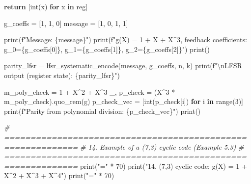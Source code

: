 \documentclass[
]{article}
\newenvironment{Shaded}{}{}
\newcommand{\BuiltInTok}[1]{\textcolor[rgb]{0.00,0.50,0.00}{#1}}
\newcommand{\CharTok}[1]{\textcolor[rgb]{0.25,0.44,0.63}{#1}}
\newcommand{\CommentTok}[1]{\textcolor[rgb]{0.38,0.63,0.69}{\textit{#1}}}
\newcommand{\ControlFlowTok}[1]{\textcolor[rgb]{0.00,0.44,0.13}{\textbf{#1}}}
\newcommand{\DecValTok}[1]{\textcolor[rgb]{0.25,0.63,0.44}{#1}}
\newcommand{\KeywordTok}[1]{\textcolor[rgb]{0.00,0.44,0.13}{\textbf{#1}}}
\newcommand{\NormalTok}[1]{#1}
\newcommand{\OperatorTok}[1]{\textcolor[rgb]{0.40,0.40,0.40}{#1}}
\newcommand{\SpecialCharTok}[1]{\textcolor[rgb]{0.25,0.44,0.63}{#1}}
\newcommand{\SpecialStringTok}[1]{\textcolor[rgb]{0.73,0.40,0.53}{#1}}
\newcommand{\StringTok}[1]{\textcolor[rgb]{0.25,0.44,0.63}{#1}}
\begin{document}
\begin{Shaded}
\begin{Highlighting}[]
    \ControlFlowTok{return}\NormalTok{ [}\BuiltInTok{int}\NormalTok{(x) }\ControlFlowTok{for}\NormalTok{ x }\KeywordTok{in}\NormalTok{ reg]}

\NormalTok{g\_coeffs }\OperatorTok{=}\NormalTok{ [}\DecValTok{1}\NormalTok{, }\DecValTok{1}\NormalTok{, }\DecValTok{0}\NormalTok{]}
\NormalTok{message }\OperatorTok{=}\NormalTok{ [}\DecValTok{1}\NormalTok{, }\DecValTok{0}\NormalTok{, }\DecValTok{1}\NormalTok{, }\DecValTok{1}\NormalTok{]}

\BuiltInTok{print}\NormalTok{(}\SpecialStringTok{f"Message: }\SpecialCharTok{\{}\NormalTok{message}\SpecialCharTok{\}}\SpecialStringTok{"}\NormalTok{)}
\BuiltInTok{print}\NormalTok{(}\SpecialStringTok{f"g(X) = 1 + X + X\^{}3, feedback coefficients: g\_0=}\SpecialCharTok{\{}\NormalTok{g\_coeffs[}\DecValTok{0}\NormalTok{]}\SpecialCharTok{\}}\SpecialStringTok{, g\_1=}\SpecialCharTok{\{}\NormalTok{g\_coeffs[}\DecValTok{1}\NormalTok{]}\SpecialCharTok{\}}\SpecialStringTok{, g\_2=}\SpecialCharTok{\{}\NormalTok{g\_coeffs[}\DecValTok{2}\NormalTok{]}\SpecialCharTok{\}}\SpecialStringTok{"}\NormalTok{)}
\BuiltInTok{print}\NormalTok{()}

\NormalTok{parity\_lfsr }\OperatorTok{=}\NormalTok{ lfsr\_systematic\_encode(message, g\_coeffs, n, k)}
\BuiltInTok{print}\NormalTok{(}\SpecialStringTok{f"}\CharTok{\textbackslash{}n}\SpecialStringTok{LFSR output (register state): }\SpecialCharTok{\{}\NormalTok{parity\_lfsr}\SpecialCharTok{\}}\SpecialStringTok{"}\NormalTok{)}

\NormalTok{m\_poly\_check }\OperatorTok{=} \DecValTok{1} \OperatorTok{+}\NormalTok{ X}\OperatorTok{\^{}}\DecValTok{2} \OperatorTok{+}\NormalTok{ X}\OperatorTok{\^{}}\DecValTok{3}
\NormalTok{\_, p\_check }\OperatorTok{=}\NormalTok{ (X}\OperatorTok{\^{}}\DecValTok{3} \OperatorTok{*}\NormalTok{ m\_poly\_check).quo\_rem(g)}
\NormalTok{p\_check\_vec }\OperatorTok{=}\NormalTok{ [}\BuiltInTok{int}\NormalTok{(p\_check[i]) }\ControlFlowTok{for}\NormalTok{ i }\KeywordTok{in} \BuiltInTok{range}\NormalTok{(}\DecValTok{3}\NormalTok{)]}
\BuiltInTok{print}\NormalTok{(}\SpecialStringTok{f"Parity from polynomial division: }\SpecialCharTok{\{}\NormalTok{p\_check\_vec}\SpecialCharTok{\}}\SpecialStringTok{"}\NormalTok{)}
\BuiltInTok{print}\NormalTok{()}

\CommentTok{\# ============================================================}
\CommentTok{\# 14. Example of a (7,3) cyclic code (Example 5.3)}
\CommentTok{\# ============================================================}
\BuiltInTok{print}\NormalTok{(}\StringTok{"="} \OperatorTok{*} \DecValTok{70}\NormalTok{)}
\BuiltInTok{print}\NormalTok{(}\StringTok{"14. (7,3) cyclic code: g(X) = 1 + X\^{}2 + X\^{}3 + X\^{}4"}\NormalTok{)}
\BuiltInTok{print}\NormalTok{(}\StringTok{"="} \OperatorTok{*} \DecValTok{70}\NormalTok{)}


\end{Highlighting}
\end{Shaded}
\end{document}
